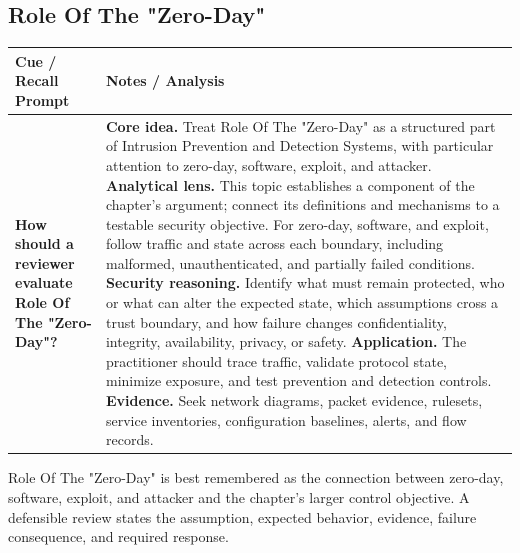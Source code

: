 \documentclass[11pt]{article}
\newcommand{\CornellHeader}{%
\rowcolor{Navy}\color{white}\bfseries Cue / Recall Prompt & \color{white}\bfseries Notes / Analysis\\\hline}
\newcommand{\CornellRow}[2]{%
\cellcolor{CueGray}\RaggedRight\textbf{#1} & \RaggedRight #2\\\hline}
\begin{document}
\subsection*{Role Of The "Zero-Day"}
\begin{longtable}{>{\RaggedRight\arraybackslash}p{}|>{\RaggedRight\arraybackslash}p{}}
\CornellHeader
\CornellRow{How should a reviewer evaluate Role Of The "Zero-Day"?}{\textbf{Core idea.} Treat Role Of The "Zero-Day" as a structured part of Intrusion Prevention and Detection Systems, with particular attention to zero-day, software, exploit, and attacker. \textbf{Analytical lens.} This topic establishes a component of the chapter's argument; connect its definitions and mechanisms to a testable security objective. For zero-day, software, and exploit, follow traffic and state across each boundary, including malformed, unauthenticated, and partially failed conditions. \textbf{Security reasoning.} Identify what must remain protected, who or what can alter the expected state, which assumptions cross a trust boundary, and how failure changes confidentiality, integrity, availability, privacy, or safety. \textbf{Application.} The practitioner should trace traffic, validate protocol state, minimize exposure, and test prevention and detection controls. \textbf{Evidence.} Seek network diagrams, packet evidence, rulesets, service inventories, configuration baselines, alerts, and flow records.}
\end{longtable}
\begin{topicsummary}
Role Of The "Zero-Day" is best remembered as the connection between zero-day, software, exploit, and attacker and the chapter's larger control objective. A defensible review states the assumption, expected behavior, evidence, failure consequence, and required response.
\end{topicsummary}
\end{document}
